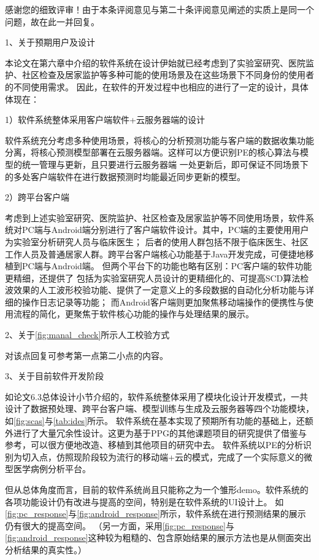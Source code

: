 感谢您的细致评审！由于本条评阅意见与第二十条评阅意见阐述的实质上是同一个问题，故在此一并回复。

1、关于预期用户及设计

本论文在第六章中介绍的软件系统在设计伊始就已经考虑到了实验室研究、医院监护、社区检查及居家监护等多种可能的使用场景及在这些场景下不同身份的使用者的不同使用需求。
因此，在软件的开发过程中也相应的进行了一定的设计，具体体现在：

1）软件系统整体采用客户端软件+云服务器端的设计

软件系统充分考虑多种使用场景，将核心的分析预测功能与客户端的数据收集功能分离，将核心预测模型部署在云服务器端。这样可以方便识别PE的核心算法与模型的统一管理与更新，且只要进行云服务器端
一处更新后，即可保证不同场景下的多处客户端软件在进行数据预测时均能最近同步更新的模型。

2）跨平台客户端

考虑到上述实验室研究、医院监护、社区检查及居家监护等不同使用场景，软件系统对PC端与Android端分别进行了客户端软件设计。其中，PC端的主要使用用户为实验室分析研究人员与临床医生；
后者的使用人群包括不限于临床医生、社区工作人员及普通居家人群。跨平台客户端核心功能基于Java开发完成，可便捷地移植到PC端与Android端。
但两个平台下的功能也略有区别：PC客户端的软件功能更精细，还提供了
包括为实验室研究人员设计的更精细化的、可提高SCD算法检波效果的人工波形校验功能、提供了一定意义上的多段数据的自动化分析功能与详细的操作日志记录等功能；
而Android客户端则更加聚焦移动端操作的便携性与使用流程的简化，更聚焦于软件核心功能的操作与处理结果的展示。

2、关于\autoref{fig:manal_check}所示人工校验方式

对该点回复可参考第一点第二小点的内容。

3、关于目前软件开发阶段

如论文6.3总体设计小节介绍的，软件系统整体采用了模块化设计开发模式，一共设计了数据预处理、跨平台客户端、模型训练与生成及云服务器等四个功能模块，
如\autoref{fig:scas}与\autoref{tab:ides}所示。
软件系统在基本实现了预期所有功能的基础上，还额外进行了大量冗余性设计。这更为基于PPG的其他课题项目的研究提供了借鉴与参考，可以很方便地改造、移植到其他项目的研究中去。
软件系统以PE的分析识别为切入点，仿照现阶段较为流行的移动端+云的模式，完成了一个实际意义的微型医学病例分析平台。

但从总体角度而言，目前的软件系统尚且只能称之为一个雏形demo。软件系统的各项功能设计仍有改进与提高的空间，特别是在软件系统的UI设计上。
如\autoref{fig:pc_response}与\autoref{fig:android_response}所示，软件系统在进行预测结果的展示仍有很大的提高空间。
（另一方面，采用\autoref{fig:pc_response}与\autoref{fig:android_response}这种较为粗糙的、包含原始结果的展示方法也是从侧面突出分析结果的真实性。）

